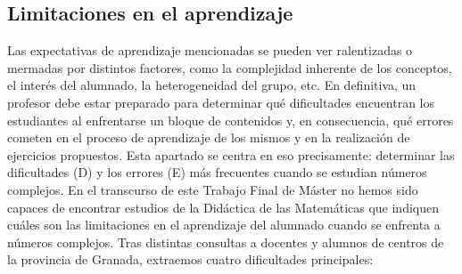 \documentclass[../main.tex]{memoir}
\begin{document}
\subsection{Limitaciones en el aprendizaje}

Las expectativas de aprendizaje mencionadas se pueden ver ralentizadas o mermadas por distintos factores, como la complejidad inherente de los conceptos, el interés del alumnado, la heterogeneidad del grupo, etc. En definitiva, un profesor debe estar preparado para determinar qué dificultades encuentran los estudiantes al enfrentarse un bloque de contenidos y, en consecuencia, qué errores cometen en el proceso de aprendizaje de los mismos y en la realización de ejercicios propuestos. Esta apartado se centra en eso precisamente: determinar las dificultades (D) y los errores (E) más frecuentes cuando se estudian números complejos. En el transcurso de este Trabajo Final de Máster no hemos sido capaces de encontrar estudios de la Didáctica de las Matemáticas que indiquen cuáles son las limitaciones en el aprendizaje del alumnado cuando se enfrenta a números complejos. Tras distintas consultas a docentes y alumnos de centros de la provincia de Granada, extraemos cuatro dificultades principales:
\end{document}
